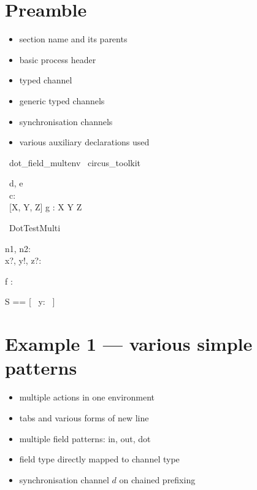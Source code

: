 \documentclass{article}
\begin{document}
\section{Preamble}

\begin{itemize}
   \item section name and its parents
   \item basic process header
   \item typed channel
   \item generic typed channels
   \item synchronisation channels
   \item various auxiliary declarations used
\end{itemize}

\begin{zsection}
  \SECTION\ dot\_field\_multenv \parents\ circus\_toolkit
\end{zsection}

\begin{circus}
  \circchannel\ d, e \\
   \circchannel\ c: \nat \cross \nat \cross \nat \\
   \circchannel\ [X, Y, Z] g : X \cross Y \cross Z
\end{circus}

\begin{circus}
   \circprocess\ DotTestMulti \circdef \circbegin
\end{circus}

\begin{axdef}
   n1, n2: \nat \\
   x?, y!, z?: \nat
\end{axdef}

\begin{axdef}
   f : \nat \fun \nat \cross \nat
\end{axdef}

\begin{zed}
   S == [~ y: \nat ~]
\end{zed}

\newpage
\section{Example 1 --- various simple patterns}

\begin{itemize}
   \item multiple actions in one environment
   \item tabs and various forms of new line
   \item multiple field patterns: in, out, dot
   \item field type directly mapped to channel type
   \item synchronisation channel $d$ on chained prefixing
\end{itemize}
\end{document}
